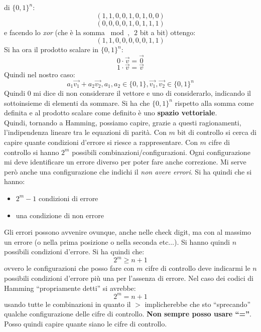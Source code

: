 \documentclass[a4paper,12pt, oneside]{book}
\begin{document}
di $\{0,1\}^n$:
\[(1,1,0,0,1,0,1,0,0)\]
\[(0,0,0,0,1,0,1,1,1)\]
e facendo lo \textit{xor} (che è la somma $\bmod,\,\,\,2$ bit a bit) ottengo:
\[(1,1,0,0,0,0,0,1,1)\]
Si ha ora il prodotto scalare in $\{0,1\}^n$:
\[0\cdot \vec{v}=\vec{0}\]
\[1\cdot \vec{v}=\vec{v}\]
Quindi nel nostro caso:
\[a_1\vec{v_1}+a_2\vec{v_2},a_1,a_2\in \{0,1\}, \vec{v_1},\vec{v_2}\in
  \{0,1\}^n\]
Quindi 0 mi dice di non considerare il vettore e uno di considerarlo, indicando
il sottoinsieme di elementi da sommare.
Si ha che $\{0,1\}^n$ rispetto alla somma come definita e al prodotto scalare
come definito è uno \textbf{spazio vettoriale}.\\
Quindi, tornando a Hamming, possiamo capire, grazie a questi ragionamenti,
l'indipendenza lineare tra le equazioni di parità. Con $m$ bit di controllo si
cerca di capire quante condizioni d'errore si riesce a rappresentare. Con $m$
cifre di controllo si hanno $2^m$ possibili combinazioni/configurazioni. Ogni
configurazione mi deve identificare un errore diverso per poter fare anche
correzione. Mi serve però anche una configurazione che indichi il \textit{non
  avere errori}. Si ha quindi che si hanno:
\begin{itemize}
  \item $2^m-1$ condizioni di errore
  \item una condizione di non errore
\end{itemize}
Gli errori possono avvenire ovunque, anche nelle check digit, ma con al massimo
un errore (o nella prima posizione o nella seconda etc$\ldots$). Si hanno quindi
$n$ possibili condizioni d'errore. Si ha quindi che:
\[2^m\geq n+1\]
ovvero le configurazioni che posso fare con $m$ cifre di controllo deve
indicarmi le $n$ possibili condizioni d'errore più una per l'assenza di errore.
Nel caso dei codici di Hamming ``propriamente detti'' si avrebbe:
\[2^m= n+1\]
usando tutte le combinazioni in quanto il $>$ implicherebbe che sto
``sprecando'' qualche configurazione delle cifre di controllo. \textbf{Non
  sempre posso usare ``=''}.\\
Posso quindi capire quante siano le cifre di controllo.
\end{document}
